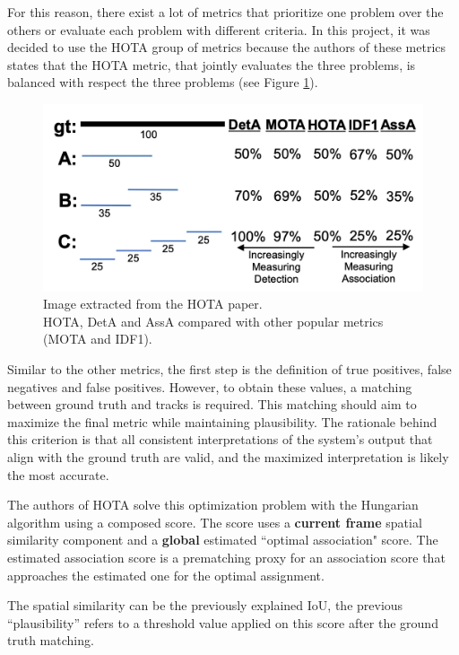 {
    For this reason, there exist a lot of metrics that prioritize one problem over the others or evaluate each problem with different criteria.
    In this project, it was decided to use the \ac{HOTA}\cite{luiten2020IJCV} group of metrics because the authors of these metrics states that the \ac{HOTA} metric, that jointly evaluates the three problems, is balanced with respect the three problems (see Figure \ref{fig:hota_vs_others}).
}

\begin{figure}[!h]
    \centering
    \includegraphics[width=0.75\linewidth]{figures/05_methodology/HOTA_vs_other.png}
    \caption[HOTA compared with other metrics]{\footnotesize{
        Image extracted from the HOTA paper\cite{luiten2020IJCV}. \\
        HOTA, DetA and AssA compared with other popular metrics (MOTA\cite{MOTA} and IDF1\cite{ristani2016performance}).
        }}
    \label{fig:hota_vs_others}
\end{figure}

{
    Similar to the other metrics, the first step is the definition of true positives, false negatives and false positives. 
    However, to obtain these values, a matching between ground truth and tracks is required.
    This matching should aim to maximize the final metric while maintaining plausibility. 
    The rationale behind this criterion is that all consistent interpretations of the system's output that align with the ground truth are valid, 
    and the maximized interpretation is likely the most accurate.
}

{
    The authors of \ac{HOTA} solve this optimization problem with the Hungarian algorithm using a composed score. The score uses a \textbf{current frame} spatial similarity component and a \textbf{global} estimated ``optimal association" score.
    The estimated association score is a prematching proxy for an association score that approaches the estimated one for the optimal assignment.
}

{
    The spatial similarity can be the previously explained \ac{IoU}, the previous ``plausibility'' refers to a threshold value applied on this score after the ground truth matching. 
}

